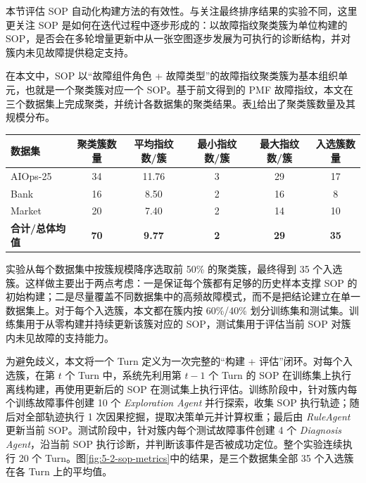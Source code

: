 本节评估 SOP 自动化构建方法的有效性。与关注最终排序结果的实验不同，这里更关注 SOP 是如何在迭代过程中逐步形成的：以故障指纹聚类簇为单位构建的 SOP，是否会在多轮增量更新中从一张空图逐步发展为可执行的诊断结构，并对簇内未见故障提供稳定支持。

在本文中，SOP 以“故障组件角色 + 故障类型”的故障指纹聚类簇为基本组织单元，也就是一个聚类簇对应一个 SOP。基于前文得到的 PMF 故障指纹，本文在三个数据集上完成聚类，并统计各数据集的聚类结果。表\ref{tab:sop_cluster_stats}给出了聚类簇数量及其规模分布。

\begin{table}[htbp]
    \centering
    \label{tab:sop_cluster_stats}
    \ChapFiveTableSetup
    \begin{tabular}{lccccc}
        \toprule
        \rowcolor{\ChapFiveTableHeadColor}
        \textbf{数据集} & \textbf{聚类簇数量} & \textbf{平均指纹数/簇} & \textbf{最小指纹数/簇} & \textbf{最大指纹数/簇} & \textbf{入选簇数量} \\
        \midrule
        AIOps-25 & 34 & 11.76 & 3 & 29 & 17 \\
        Bank & 16 & 8.50 & 2 & 16 & 8 \\
        Market & 20 & 7.40 & 2 & 14 & 10 \\
        \midrule
        \rowcolor{\ChapFiveTableStatColor}
        \textbf{合计/总体均值} & \textbf{70} & \textbf{9.77} & \textbf{2} & \textbf{29} & \textbf{35} \\
        \bottomrule
    \end{tabular}
\end{table}

实验从每个数据集中按簇规模降序选取前 50\% 的聚类簇，最终得到 35 个入选簇。这样做主要出于两点考虑：一是保证每个簇都有足够的历史样本支撑 SOP 的初始构建；二是尽量覆盖不同数据集中的高频故障模式，而不是把结论建立在单一数据集上。对于每个入选簇，本文都在簇内按 60\%/40\% 划分训练集和测试集。训练集用于从零构建并持续更新该簇对应的 SOP，测试集用于评估当前 SOP 对簇内未见故障的支持能力。

为避免歧义，本文将一个 Turn 定义为一次完整的“构建 + 评估”闭环。对每个入选簇，在第 $t$ 个 Turn 中，系统先利用第 $t-1$ 个 Turn 的 SOP 在训练集上执行离线构建，再使用更新后的 SOP 在测试集上执行评估。训练阶段中，针对簇内每个训练故障事件创建 10 个 \textit{Exploration Agent} 并行探索，收集 SOP 执行轨迹；随后对全部轨迹执行 1 次因果挖掘，提取决策单元并计算权重；最后由 \textit{RuleAgent} 更新当前 SOP。测试阶段中，针对簇内每个测试故障事件创建 4 个 \textit{Diagnosis Agent}，沿当前 SOP 执行诊断，并判断该事件是否被成功定位。整个实验连续执行 20 个 Turn。图\ref{fig:5-2-sop-metrics}中的结果，是三个数据集全部 35 个入选簇在各 Turn 上的平均值。

